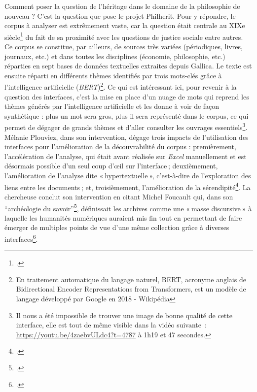 Comment poser la question de l’héritage dans le domaine de la philosophie de nouveau ? C’est la question que pose le projet Philherit. Pour y répondre, le corpus à analyser est extrêmement vaste, car la question était centrale au XIXe siècle\footcite{plouviez2023} du fait de sa proximité avec les questions de justice sociale entre autres. Ce corpus se constitue, par ailleurs, de sources très variées (périodiques, livres, journaux, etc.) et dans toutes les disciplines (économie, philosophie, etc.) réparties en sept bases de données textuelles extraites depuis Gallica. Le texte est ensuite réparti en différents thèmes identifiés par trois mots-clés grâce à l’intelligence artificielle (\textit{BERT})\footnote{En traitement automatique du langage naturel, BERT, acronyme anglais de Bidirectional Encoder Representations from Transformers, est un modèle de langage développé par Google en 2018 - Wikipédia}. Ce qui est intéressant ici, pour revenir à la question des interfaces, c’est la mise en place d’un nuage de mots qui reprend les thèmes générés par l’intelligence artificielle et les donne à voir de façon synthétique : plus un mot sera gros, plus il sera représenté dans le corpus, ce qui permet de dégager de grands thèmes et d’aller consulter les ouvrages essentiels\footnote{Il nous a été impossible de trouver une image de bonne qualité de cette interface, elle est tout de même visible dans la vidéo suivante : \url{https://youtu.be/4zaebvULdc4?t=4787} à 1h19 et 47 secondes.}. Mélanie Plouviez, dans son intervention, dégage trois impacts de l’utilisation des interfaces pour l’amélioration de la découvrabilité du corpus : premièrement, l’accélération de l’analyse, qui était avant réalisée sur \textit{Excel} manuellement et est désormais possible d’un seul coup d’œil sur l’interface ; deuxièmement, l’amélioration de l’analyse dite « hypertextuelle », c’est-à-dire de l’exploration des liens entre les documents ; et, troisièmement, l’amélioration de la sérendipité\footcite{plouviez2023}. La chercheuse conclut son intervention en citant Michel Foucault qui, dans son \enquote{archéologie du savoir}\footcite{foucault_archeologie_2008}, définissait les archives comme une « masse discursive » à laquelle les humanités numériques auraient mis fin tout en permettant de faire émerger de multiples points de vue d’une même collection grâce à diverses interfaces\footcite{plouviez_philosophie_2023}.


